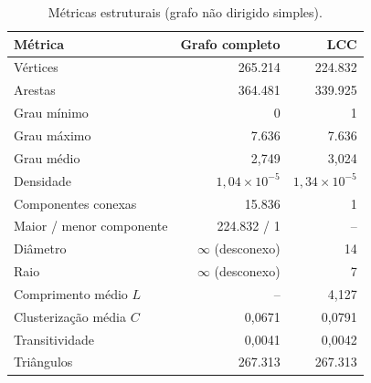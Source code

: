 \begin{table}[t]
  \caption{Métricas estruturais (grafo não dirigido simples).}
  \label{tab:parte1}
\small
\begin{tabular}{lrr}
  \toprule
  Métrica & Grafo completo & LCC \\
  \midrule
  Vértices & 265.214 & 224.832 \\
  Arestas & 364.481 & 339.925 \\
  Grau mínimo & 0 & 1 \\
  Grau máximo & 7.636 & 7.636 \\
  Grau médio & 2,749 & 3,024 \\
  Densidade & $1{,}04\times10^{-5}$ & $1{,}34\times10^{-5}$ \\
  Componentes conexas & 15.836 & 1 \\
  Maior / menor componente & 224.832 / 1 & -- \\
  Diâmetro & $\infty$ (desconexo) & 14 \\
  Raio & $\infty$ (desconexo) & 7 \\
  Comprimento médio $L$ & -- & 4,127 \\
  Clusterização média $C$ & 0,0671 & 0,0791 \\
  Transitividade & 0,0041 & 0,0042 \\
  Triângulos & 267.313 & 267.313 \\
  \bottomrule
\end{tabular}
\end{table}

